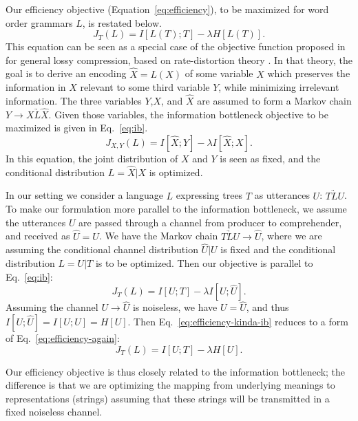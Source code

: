 \documentclass[12pt]{article}
\begin{document}
Our efficiency objective (Equation~\ref{eq:efficiency}), to be maximized for word order grammars $L$, is restated below.
\begin{equation}
    \label{eq:efficiency-again}
    J_T(L) = I[L(T); T] - \lambda H[L(T)].
\end{equation}
This equation can be seen as a special case of the objective function proposed in \citet{tishby1999information} for general lossy compression, based on rate-distortion theory \citep{cover2006elements,harremoes2007information}. In that theory, the goal is to derive an encoding $\hat{X}=L(X)$ of some variable $X$ which preserves the information in $X$ relevant to some third variable $Y$, while minimizing irrelevant information. The three variables $Y$,$X$, and $\hat{X}$ are assumed to form a Markov chain $Y \rightarrow X \underrightarrow{L} \hat{X}$. Given those variables, the information bottleneck objective to be maximized is given in Eq.~\ref{eq:ib}.
\begin{equation}
    \label{eq:ib}
    J_{X,Y}(L) = I[\hat{X}; Y] - \lambda I[\hat{X}; X].
\end{equation}
In this equation, the joint distribution of $X$ and $Y$ is seen as fixed, and the conditional distribution $L=\hat{X}|X$ is optimized.

In our setting we consider a language $L$ expressing trees $T$ as utterances $U$: $T \underrightarrow{L} U$. To make our formulation more parallel to the information bottleneck, we assume the utterances $U$ are passed through a channel from producer to comprehender, and received as $\hat{U}=U$. We have the Markov chain $T \underrightarrow{L} U \rightarrow \hat{U}$, where we are assuming the conditional channel distribution $\hat{U}|U$ is fixed and the conditional distribution $L=U|T$ is to be optimized. Then our objective is parallel to Eq.~\ref{eq:ib}:
\begin{equation}
    \label{eq:efficiency-kinda-ib}
    J_T(L) = I[U;T] - \lambda I[U;\hat{U}]. %
\end{equation}
Assuming the channel $U \rightarrow \hat{U}$ is noiseless, we have $U=\hat{U}$, and thus $I[U;\hat{U}]=I[U;U] = H[U]$. Then Eq.~\ref{eq:efficiency-kinda-ib} reduces to a form of Eq.~\ref{eq:efficiency-again}:
\begin{equation*}
    J_T(L) = I[U;T] - \lambda H[U].
\end{equation*}

Our efficiency objective is thus closely related to the information bottleneck; the difference is that we are optimizing the mapping from underlying meanings to representations (strings) assuming that these strings will be transmitted in a fixed noiseless channel.
\end{document}
